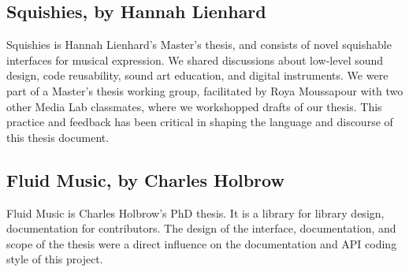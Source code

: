 \subsection{Squishies, by Hannah Lienhard}

Squishies is Hannah Lienhard's Master's thesis, and consists of novel squishable interfaces for musical expression. We shared discussions about low-level sound design, code reusability, sound art education, and digital instruments. We were part of a Master's thesis working group, facilitated by Roya Moussapour with two other Media Lab classmates, where we workshopped drafts of our thesis. This practice and feedback has been critical in shaping the language and discourse of this thesis document.

\subsection{Fluid Music, by Charles Holbrow}

Fluid Music is Charles Holbrow's PhD thesis. It is a library for library design, documentation for contributors. The design of the interface, documentation, and scope of the thesis were a direct influence on the documentation and API coding style of this project.
